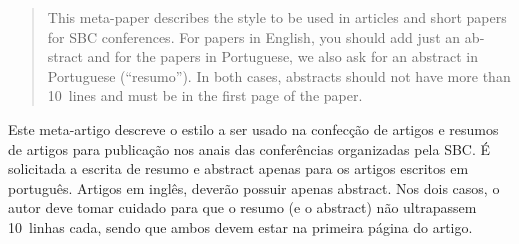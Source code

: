 \begin{abstract}
\begin{otherlanguage}{english}
This meta-paper describes the style to be used in articles and short
papers for SBC conferences. For papers in English, you should add just
an abstract and for the papers in Portuguese, we also ask for an
abstract in Portuguese (``resumo''). In both cases, abstracts should not
have more than 10~lines and must be in the first page of the paper.
\end{otherlanguage}
\end{abstract}

\begin{resumo}
Este meta-artigo descreve o estilo a ser usado na confecção de artigos
e resumos de artigos para publicação nos anais das conferências
organizadas pela SBC. É solicitada a escrita de resumo e abstract apenas
para os artigos escritos em português. Artigos em inglês, deverão
possuir apenas abstract. Nos dois casos, o autor deve tomar cuidado para
que o resumo (e o abstract) não ultrapassem 10~linhas cada, sendo que
ambos devem estar na primeira página do artigo.
\end{resumo}

